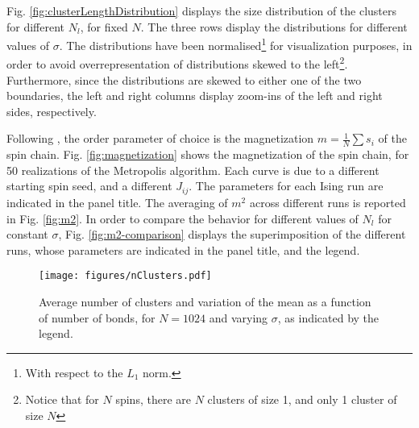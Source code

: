Fig. \ref{fig:clusterLengthDistribution} displays the size distribution of the clusters for different $N_l$, for fixed $N.$ The three rows display the distributions for different values of  $\sigma.$ The distributions have been normalised\footnote{With respect to the $L_1$ norm.} for visualization purposes, in order to avoid overrepresentation of distributions skewed to the left\footnote{Notice that for  $N$ spins, there are  $N$ clusters of size 1, and only 1 cluster of size $N$}. Furthermore, since the distributions are skewed to either one of the two boundaries, the left and right columns display zoom-ins of the left and right sides, respectively.

Following \cite{Janke2023}, the order parameter of choice is the magnetization $m = \frac{1}{N}\sum s_i $ of the spin chain. Fig. \ref{fig:magnetization} shows the magnetization of the spin chain, for 50 realizations of the Metropolis algorithm. Each curve is due to a different starting spin seed, and a different $J_{ij}$. The parameters for each Ising run are indicated in the panel title. The averaging of $m^2$ across different runs is reported in Fig. \ref{fig:m2}. In order to compare the behavior for different values of  $N_l$ for constant $\sigma$, Fig. \ref{fig:m2-comparison} displays the superimposition of the different runs, whose parameters are indicated in the panel title, and the legend.

\begin{figure}
	\centering
	\texttt{[image: figures/nClusters.pdf]}
	\caption{Average number of clusters and variation of the mean as a function of number of bonds, for $N=1024$ and varying $\sigma$, as indicated by the legend.}
	\label{fig:nClusters}
\end{figure}

